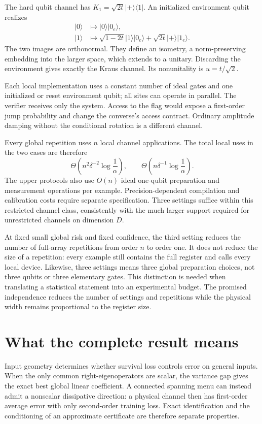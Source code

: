\documentclass[11pt,a4paper]{article}
\newcommand{\ket}[1]{\lvert #1\rangle}
\newcommand{\bra}[1]{\langle #1\rvert}
\numberwithin{equation}{section}
\begin{document}
The hard qubit channel has $K_1=\sqrt{2t}\ket+\bra1$. An initialized environment qubit realizes
\begin{align*}
 \ket0&\longmapsto\ket0\ket{0_e},\\
 \ket1&\longmapsto\sqrt{1-2t}\ket1\ket{0_e}
                     +\sqrt{2t}\ket+\ket{1_e}.
\end{align*}
The two images are orthonormal. They define an isometry, a norm-preserving embedding into the larger space, which extends to a unitary. Discarding the environment gives exactly the Kraus channel. Its nonunitality is $u=t/\sqrt2$.

Each local implementation uses a constant number of ideal gates and one initialized or reset environment qubit; all sites can operate in parallel. The verifier receives only the system. Access to the flag would expose a first-order jump probability and change the converse's access contract. Ordinary amplitude damping without the conditional rotation is a different channel.

Every global repetition uses $n$ local channel applications. The total local uses in the two cases are therefore
\[
 \Theta\!\left(n^2\delta^{-2}\log\frac1\alpha\right),
 \qquad
 \Theta\!\left(n\delta^{-1}\log\frac1\alpha\right).
\]
The upper protocols also use $O(n)$ ideal one-qubit preparation and measurement operations per example. Precision-dependent compilation and calibration costs require separate specification. Three settings suffice within this restricted channel class, consistently with the much larger support required for unrestricted channels on dimension $D$.

At fixed small global risk and fixed confidence, the third setting reduces the number of full-array repetitions from order $n$ to order one. It does not reduce the size of a repetition: every example still contains the full register and calls every local device. Likewise, three settings means three global preparation choices, not three qubits or three elementary gates. This distinction is needed when translating a statistical statement into an experimental budget. The promised independence reduces the number of settings and repetitions while the physical width remains proportional to the register size.


\section{What the complete result means}
\label{sec:closing}

Input geometry determines whether survival loss controls error on general inputs. When the only common right-eigenoperators are scalar, the variance gap gives the exact best global linear coefficient. A connected spanning menu can instead admit a nonscalar dissipative direction: a physical channel then has first-order average error with only second-order training loss. Exact identification and the conditioning of an approximate certificate are therefore separate properties.
\end{document}
